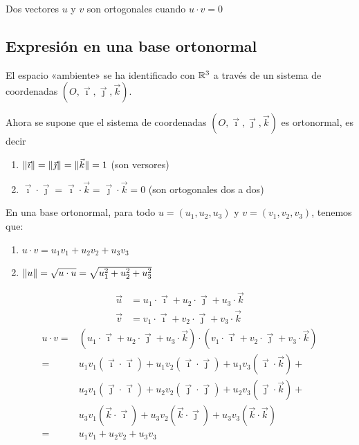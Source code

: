 \documentclass[11pt,a4paper]{article}
\begin{document}
\begin{definicion}
Dos vectores $u$ y $v$ son ortogonales cuando $u\cdot v=0$
\end{definicion}

\subsection{Expresión en una base ortonormal}

El espacio «ambiente» se ha identificado con $\mathbb{R}^3$ a través de un sistema de coordenadas $(O,\vec\imath,\vec\jmath,\vec k)$.

Ahora se supone que el sistema de coordenadas $(O,\vec\imath,\vec\jmath,\vec k)$ es ortonormal, es decir
\begin{enumerate}[label=(\arabic*)]
  \item $\lVert\vec\imath\rVert=\lVert\vec\jmath\rVert=\lVert\vec k\rVert=1$ \quad (son versores)
  \item $\vec\imath\cdot\vec\jmath=\vec\imath\cdot\vec k=\vec\jmath\cdot\vec k=0$ \quad (son ortogonales dos a dos)
\end{enumerate}

\begin{proposicion}
En una base ortonormal, para todo $u=(u_1,u_2,u_3)$ y $v=(v_1,v_2,v_3)$, tenemos que:
\begin{enumerate}[label=(\arabic*)]
  \item $u\cdot v=u_1v_1+u_2v_2+u_3v_3$
  \item $\lVert u\rVert=\sqrt{u\cdot u}=\sqrt{u_1^2+u_2^2+u_3^2}$
\end{enumerate}
\end{proposicion}

\begin{demo}
\begin{align*}
\vec u&=u_1\cdot\vec\imath+u_2\cdot\vec\jmath+u_3\cdot\vec k\\
\vec v&=v_1\cdot\vec\imath+v_2\cdot\vec\jmath+v_3\cdot\vec k
\end{align*}
\begin{align*}
u\cdot v={}&(u_1\cdot\vec\imath+u_2\cdot\vec\jmath+u_3\cdot\vec k)\cdot(v_1\cdot\vec\imath+v_2\cdot\vec\jmath+v_3\cdot\vec k)\\
={}&\boxed{u_1v_1(\vec\imath\cdot\vec\imath)}+u_1v_2(\vec\imath\cdot\vec\jmath)+u_1v_3(\vec\imath\cdot\vec k)+{}\\
&u_2v_1(\vec\jmath\cdot\vec\imath)+\boxed{u_2v_2(\vec\jmath\cdot\vec\jmath)}+u_2v_3(\vec\jmath\cdot\vec k)+{}\\
&u_3v_1(\vec k\cdot\vec\imath)+u_3v_2(\vec k\cdot\vec\jmath)+\boxed{u_3v_3(\vec k\cdot\vec k)}\\
={}&u_1v_1+u_2v_2+u_3v_3
\end{align*}
\end{demo}
\end{document}
